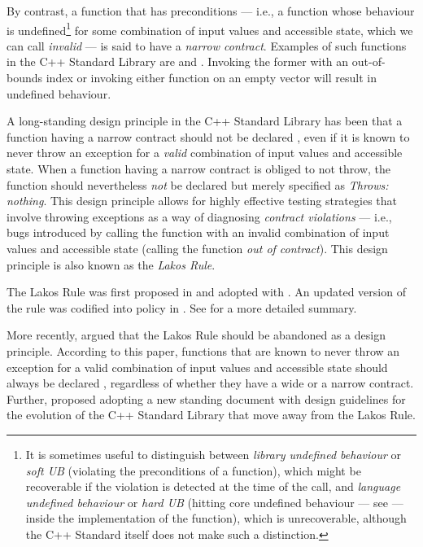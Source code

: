 By contrast, a function that has preconditions --- i.e., a function whose behaviour is undefined\footnote{It is sometimes useful to distinguish between \emph{library undefined behaviour} or \emph{soft UB} (violating the preconditions of a function), which might be recoverable if the violation is detected at the time of the call, and \emph{language undefined behaviour} or \emph{hard UB} (hitting core undefined behaviour --- see \cite{P1705R1} --- inside the implementation of the function), which is unrecoverable, although the C++ Standard itself does not make such a distinction.} for some combination of input values and accessible state, which we can call \emph{invalid} --- is said to have a \emph{narrow contract}. Examples of such functions in the C++ Standard Library are  and . Invoking the former with an out-of-bounds index or invoking either function on an empty vector will result in undefined behaviour.

A long-standing design principle in the C++ Standard Library has been that a function having a narrow contract should not be declared , even if it is known to never throw an exception for a \emph{valid} combination of input values and accessible state. When a function having a narrow contract is obliged to not throw, the function should nevertheless \emph{not} be declared  but merely specified as \emph{Throws: nothing}. This design principle allows for highly effective testing strategies that involve throwing exceptions as a way of diagnosing \emph{contract violations} --- i.e., bugs introduced by calling the function with an invalid combination of input values and accessible state (calling the function \emph{out of contract}). This design principle is also known as the \emph{Lakos Rule}.

The Lakos Rule was first proposed in \cite{N3248} and adopted with \cite{N3279}. An updated version of the rule was codified into policy in \cite{P0884R0}. See \cite{O'Dwyer2018} for a more detailed summary.

More recently, \cite{P1656R2} argued that the Lakos Rule should be abandoned as a design principle. According to this paper, functions that are known to never throw an exception for a valid combination of input values and accessible state should always be declared , regardless of whether they have a wide or a narrow contract. Further, \cite{P2148R0} proposed adopting a new standing document with design guidelines for the evolution of the C++ Standard Library that move away from the Lakos Rule.

